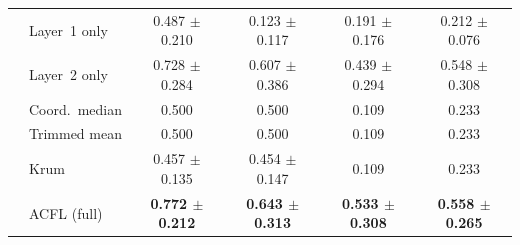 \begin{table}[t]
{\begin{tabular}{llcccc}
 & Layer~1 only & 0.487 $\pm$ 0.210 & 0.123 $\pm$ 0.117 & 0.191 $\pm$ 0.176 & 0.212 $\pm$ 0.076 \\
 & Layer~2 only & 0.728 $\pm$ 0.284 & 0.607 $\pm$ 0.386 & 0.439 $\pm$ 0.294 & 0.548 $\pm$ 0.308 \\
 & Coord.\ median & 0.500 & 0.500 & 0.109 & 0.233 \\
 & Trimmed mean & 0.500 & 0.500 & 0.109 & 0.233 \\
 & Krum & 0.457 $\pm$ 0.135 & 0.454 $\pm$ 0.147 & 0.109 & 0.233 \\
 & ACFL (full) & \textbf{0.772 $\pm$ 0.212} & \textbf{0.643 $\pm$ 0.313} & \textbf{0.533 $\pm$ 0.308} & \textbf{0.558 $\pm$ 0.265} \\
\bottomrule
\end{tabular}}
\end{table}

